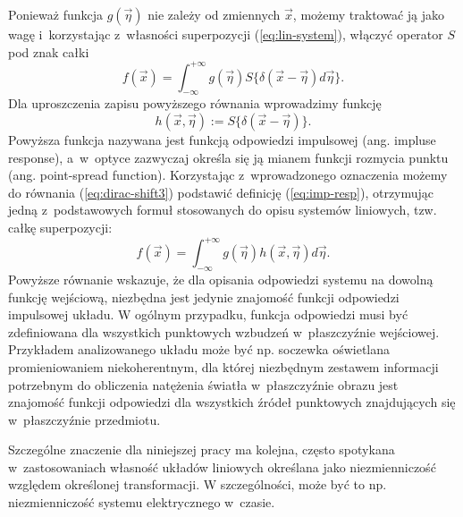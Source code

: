 Ponieważ funkcja $g(\vec{\eta})$ nie zależy od zmiennych $\vec{x}$, możemy traktować ją jako wagę i~korzystając z~własności superpozycji (\ref{eq:lin-system}), włączyć operator $S{}$ pod znak całki
\begin{equation}
f(\vec{x})=\int_{-\infty}^{+\infty} g(\vec{\eta})  S\{\delta(\vec{x}-\vec{\eta}) d \vec{\eta} \}.
\label{eq:dirac-shift3}
\end{equation}
Dla uproszczenia zapisu powyższego równania wprowadzimy funkcję
\begin{equation}
h(\vec{x},\vec{\eta}):=S\{\delta(\vec{x}-\vec{\eta})\}.
\label{eq:imp-resp}
\end{equation}
Powyższa funkcja nazywana jest funkcją odpowiedzi impulsowej (ang. impluse response), a~w~optyce zazwyczaj określa się ją mianem funkcji rozmycia punktu (ang. point-spread function). Korzystając z~wprowadzonego oznaczenia możemy do równania (\ref{eq:dirac-shift3})  podstawić definicję (\ref{eq:imp-resp}), otrzymując jedną z~podstawowych formuł stosowanych do opisu systemów liniowych, tzw. całkę superpozycji:
\begin{equation}
f(\vec{x})=\int_{-\infty}^{+\infty} g(\vec{\eta})  h(\vec{x},\vec{\eta}) d \vec{\eta} .
\label{eq:sup-int}
\end{equation}
Powyższe równanie wskazuje, że dla opisania odpowiedzi systemu na dowolną funkcję wejściową, niezbędna jest jedynie znajomość funkcji odpowiedzi impulsowej układu. W ogólnym przypadku, funkcja odpowiedzi musi być zdefiniowana dla wszystkich punktowych wzbudzeń w~płaszczyźnie wejściowej. Przykładem analizowanego układu może być np. soczewka oświetlana promieniowaniem niekoherentnym, dla której niezbędnym zestawem informacji potrzebnym do obliczenia natężenia światła w~płaszczyźnie obrazu jest znajomość funkcji odpowiedzi dla wszystkich źródeł punktowych znajdujących się w~płaszczyźnie przedmiotu. 

Szczególne znaczenie dla niniejszej pracy ma kolejna, często spotykana w~zastosowaniach własność układów liniowych określana jako niezmienniczość względem określonej transformacji. W szczególności, może być to np. niezmienniczość systemu elektrycznego w~czasie. 

